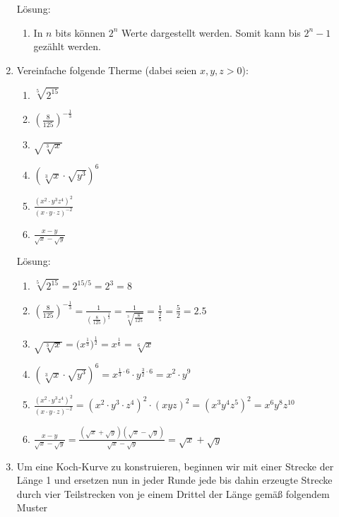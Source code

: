 \documentclass[main.tex]{subfiles}
\begin{document}
\begin{enumerate}
	      Lösung:
	      \begin{enumerate}
		      \item In \( n  \) bits können \( 2^n \) Werte dargestellt werden.
		            Somit kann bis \( 2^n - 1 \) gezählt werden.
	      \end{enumerate}
	\item
	      Vereinfache folgende Therme (dabei seien \( x, y, z > 0 \)):
	      \begin{enumerate}
		      \item \( \sqrt[5]{2^{15}} \)
		      \item \( (\frac{8}{125})^{-\frac{1}{3}} \)
		      \item \( \sqrt{\sqrt[3]{x}} \)
		      \item \( (\sqrt[3]{x} \cdot \sqrt{y^3})^6 \)
		      \item \( \frac{(x^2 \cdot y^3 z^4)^2}{
			            (x \cdot y \cdot z)^{-2}
		            } \)
		      \item \( \frac{x - y}{ \sqrt{x} - \sqrt{y} } \)
	      \end{enumerate}

	      Lösung:
	      \begin{enumerate}
		      \item \( \sqrt[5]{2^{15}}
			            = 2^{15/5} = 2^3 = 8
		            \)
		      \item \( (\frac{8}{125})^{-\frac{1}{3}}
		            = \frac{1}{ (\frac{8}{125})^{ \frac{1}{3} }}
		            = \frac{1}{ \sqrt[3]{ \frac{8}{125} }}
		            = \frac{1}{ \frac{2}{5}}
		            = \frac{5}{2}
		            = 2.5
		            \)
		      \item \( \sqrt{\sqrt[3]{x}}
		            = \Big( x^{ \frac{1}{3} } \Big)^{ \frac{1}{2} }
		            = x^{ \frac{1}{6}}
		            = \sqrt[6]{x}
		            \)
		      \item \( (\sqrt[3]{x} \cdot \sqrt{y^3})^6
		            = x^{ \frac{1}{3} \cdot 6} \cdot y^{ \frac{3}{2} \cdot 6 }
		            = x^2 \cdot y^9
		            \)
		      \item \( \frac{(x^2 \cdot y^3 z^4)^2}{
			            (x \cdot y \cdot z)^{-2}
		            }
		            = (x^2 \cdot y^3 \cdot z^4)^2 \cdot (xyz)^2
		            = (x^3y^4z^5)^2
		            = x^6y^8z^{10}
		            \)
		      \item \( \frac{x - y}{ \sqrt{x} - \sqrt{y} }
		            = \frac{ (\sqrt{x} + \sqrt{y})(\sqrt{x} - \sqrt{y}) }{
			            \sqrt{x} - \sqrt{y}}
		            = \sqrt{x} + \sqrt{y} \)
	      \end{enumerate}
	\item Um eine Koch-Kurve zu konstruieren, beginnen wir mit einer Strecke der Länge 1 und
	      ersetzen nun in jeder Runde jede bis dahin erzeugte Strecke durch vier Teilstrecken von je einem Drittel
	      der Länge gemäß folgendem Muster


\end{enumerate}
\end{document}
